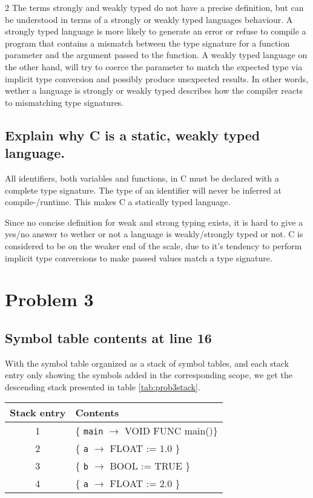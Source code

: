 \documentclass[twoside]{article}
\begin{document}
\begin{multicols}{2}
    The terms strongly and weakly typed do not have a precise definition, but can be understood in terms of a strongly or weakly typed languages behaviour. 
    A strongly typed language is more likely to generate an error or refuse to compile a program that contains a mismatch between the type signature for a function parameter and the argument passed to the function.
    A weakly typed language on the other hand, will try to coerce the parameter to match the expected type via implicit type conversion and possibly produce unexpected results.
    In other words, wether a language is strongly or weakly typed describes how the compiler reacts to mismatching type signatures.

    \subsection{Explain why C is a static, weakly typed language.}

    All identifiers, both variables and functions, in C must be declared with a complete type signature.
    The type of an identifier will never be inferred at compile-/runtime.
    This makes C a statically typed language.

    Since no concise definition for weak and strong typing exists, it is hard to give a yes/no answer to wether or not a language is weakly/strongly typed or not.
    C is considered to be on the weaker end of the scale, due to it's tendency to perform implicit type conversions to make passed values match a type signature.

    \section{Problem 3}

    \subsection{Symbol table contents at line 16}

    With the symbol table organized as a stack of symbol tables, and each stack entry only showing the symbols added in the corresponding scope, we get the descending stack presented in table \ref{tab:prob3stack}.

    \begin{table*}[t]
        \centering
        \begin{tabular}{c|l}
            Stack entry & Contents \\ \hline
            1 & \{ \texttt{main} $\rightarrow$ VOID FUNC main()\} \\ \hline
            2 & \{ \texttt{a} $\rightarrow$ FLOAT := 1.0 \} \\ \hline
            3 & \{ \texttt{b} $\rightarrow$ BOOL := TRUE \} \\ \hline
            4 & \{ \texttt{a} $\rightarrow$ FLOAT := 2.0 \} \\ \hline
        \end{tabular}
        \caption{A (descending) stack showing the contents of the symbol table at line 16} \label{tab:prob3stack}
    \end{table*}


\end{multicols}
\end{document}
